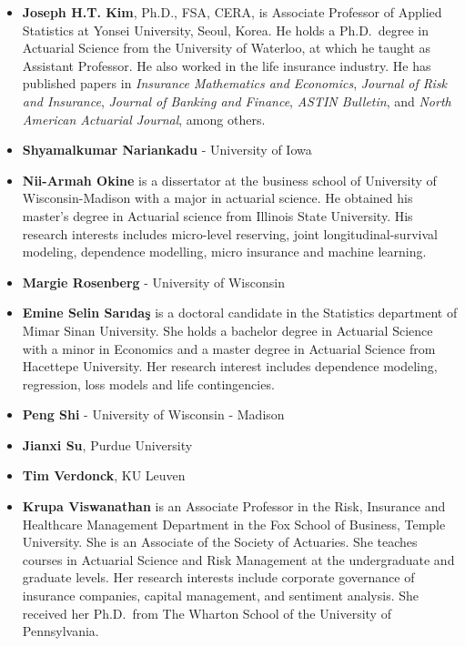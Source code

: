 \documentclass[]{book}
\providecommand{\tightlist}{%
  \setlength{\itemsep}{0pt}\setlength{\parskip}{0pt}}
\begin{document}
\begin{itemize}
\item
  \textbf{Joseph H.T. Kim}, Ph.D., FSA, CERA, is Associate Professor of
  Applied Statistics at Yonsei University, Seoul, Korea. He holds a
  Ph.D.~degree in Actuarial Science from the University of Waterloo, at
  which he taught as Assistant Professor. He also worked in the life
  insurance industry. He has published papers in \emph{Insurance
  Mathematics and Economics}, \emph{Journal of Risk and Insurance},
  \emph{Journal of Banking and Finance}, \emph{ASTIN Bulletin}, and
  \emph{North American Actuarial Journal}, among others.
\item
  \textbf{Shyamalkumar Nariankadu} - University of Iowa
\end{itemize}

\begin{itemize}
\item
  \textbf{Nii-Armah Okine} is a dissertator at the business school of
  University of Wisconsin-Madison with a major in actuarial science. He
  obtained his master's degree in Actuarial science from Illinois State
  University. His research interests includes micro-level reserving,
  joint longitudinal-survival modeling, dependence modelling, micro
  insurance and machine learning.
\item
  \textbf{Margie Rosenberg} - University of Wisconsin
\end{itemize}

\begin{itemize}
\item
  \textbf{Emine Selin Sarıdaş} is a doctoral candidate in the Statistics
  department of Mimar Sinan University. She holds a bachelor degree in
  Actuarial Science with a minor in Economics and a master degree in
  Actuarial Science from Hacettepe University. Her research interest
  includes dependence modeling, regression, loss models and life
  contingencies.
\item
  \textbf{Peng Shi} - University of Wisconsin - Madison
\item
  \textbf{Jianxi Su}, Purdue University
\item
  \textbf{Tim Verdonck}, KU Leuven
\end{itemize}

\begin{itemize}
\tightlist
\item
  \textbf{Krupa Viswanathan} is an Associate Professor in the Risk,
  Insurance and Healthcare Management Department in the Fox School of
  Business, Temple University. She is an Associate of the Society of
  Actuaries. She teaches courses in Actuarial Science and Risk
  Management at the undergraduate and graduate levels. Her research
  interests include corporate governance of insurance companies, capital
  management, and sentiment analysis. She received her Ph.D.~from The
  Wharton School of the University of Pennsylvania.
\end{itemize}
\end{document}
